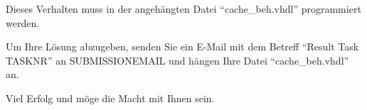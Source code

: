 \documentclass[a4paper,12pt]{article}
\begin{document}
Dieses Verhalten muss in der angeh\"angten Datei "`cache\_beh.vhdl"' programmiert werden.


Um Ihre L\"osung abzugeben, senden Sie ein E-Mail mit dem Betreff "`Result Task {{TASKNR}}"' an {{SUBMISSIONEMAIL}} und h\"angen Ihre Datei ``cache\_beh.vhdl'' an.

\vspace{0.7cm}
Viel Erfolg und m\"oge die Macht mit Ihnen sein.
\end{document}
